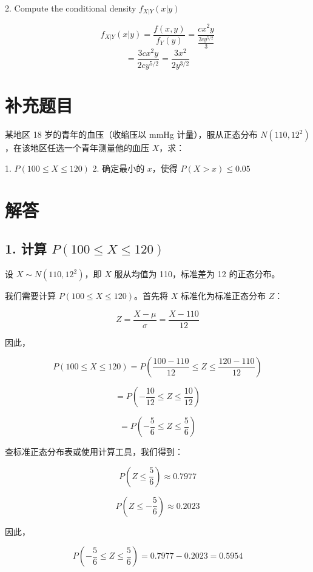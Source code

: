 \documentclass[UTF8]{report}
\theoremstyle{MyLineTheoremStyle} %
\theoremstyle{MyBlockTheoremStyle} %
\theoremstyle{MySubsubsectionStyle} %
\begin{document}
2. Compute the conditional density $f_{X|Y}(x|y)$

\[
f_{X|Y}(x|y) = \frac{f(x, y)}{f_Y(y)} = \frac{cx^2y}{\frac{2cy^{5/2}}{3}}
\]
\[
= \frac{3cx^2y}{2cy^{5/2}} = \frac{3x^2}{2y^{3/2}}
\]
















\section{补充题目}
某地区 18 岁的青年的血压（收缩压以 mmHg 计量），服从正态分布 \(N(110, 12^2)\)，在该地区任选一个青年测量他的血压 \(X\)，求：

1. \(P(100 \leq X \leq 120)\)
2. 确定最小的 \(x\)，使得 \(P(X > x) \leq 0.05\)

\section*{解答}

\subsection*{1. 计算 \(P(100 \leq X \leq 120)\)}

设 \(X \sim N(110, 12^2)\)，即 \(X\) 服从均值为 110，标准差为 12 的正态分布。

我们需要计算 \(P(100 \leq X \leq 120)\)。首先将 \(X\) 标准化为标准正态分布 \(Z\)：

\[
Z = \frac{X - \mu}{\sigma} = \frac{X - 110}{12}
\]

因此，

\[
P(100 \leq X \leq 120) = P\left(\frac{100 - 110}{12} \leq Z \leq \frac{120 - 110}{12}\right)
\]

\[
= P\left(-\frac{10}{12} \leq Z \leq \frac{10}{12}\right)
\]

\[
= P\left(-\frac{5}{6} \leq Z \leq \frac{5}{6}\right)
\]

查标准正态分布表或使用计算工具，我们得到：

\[
P\left(Z \leq \frac{5}{6}\right) \approx 0.7977
\]

\[
P\left(Z \leq -\frac{5}{6}\right) \approx 0.2023
\]

因此，

\[
P\left(-\frac{5}{6} \leq Z \leq \frac{5}{6}\right) = 0.7977 - 0.2023 = 0.5954
\]
\end{document}
